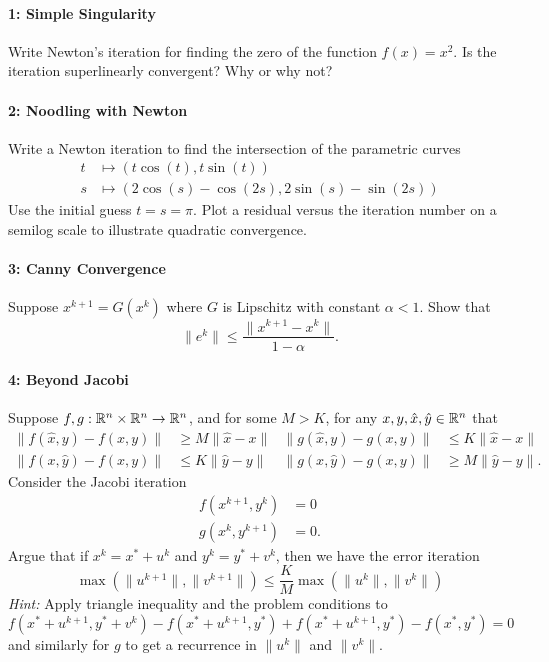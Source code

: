 \documentclass[12pt, leqno]{article}
\begin{document}

\paragraph*{1: Simple Singularity}
Write Newton's iteration for finding the zero of the function $f(x) = x^2$.
Is the iteration superlinearly convergent?  Why or why not?

\paragraph*{2: Noodling with Newton}
Write a Newton iteration to find the intersection of the
parametric curves
\begin{align*}
  t &\mapsto (t \cos(t), t \sin(t)) \\
  s &\mapsto (2 \cos(s) - \cos(2s), 2\sin(s) - \sin(2s))
\end{align*}
Use the initial guess $t = s = \pi$.  Plot a residual versus
the iteration number on a semilog scale to
illustrate quadratic convergence.

\paragraph*{3: Canny Convergence}
Suppose $x^{k+1} = G(x^k)$ where $G$ is Lipschitz with constant
$\alpha < 1$.  Show that
\[
  \|e^k\| \leq \frac{\|x^{k+1}-x^k\|}{1-\alpha}.
\]

\paragraph*{4: Beyond Jacobi}
Suppose $f,g : \mathbb{R}^n \times \mathbb{R}^n \rightarrow \mathbb{R}^n$,
and for some $M > K$, for any $x, y, \hat{x}, \hat{y} \in \mathbb{R}^n$ that
\begin{align*}
  \|f(\hat{x},y)-f(x,y)\| &\geq M \|\hat{x}-x\| &
  \|g(\hat{x},y)-g(x,y)\| &\leq K \|\hat{x}-x\| \\
  \|f(x,\hat{y})-f(x,y)\| &\leq K \|\hat{y}-y\| &
  \|g(x,\hat{y})-g(x,y)\| &\geq M \|\hat{y}-y\|.
\end{align*}
Consider the Jacobi iteration
\begin{align*}
  f(x^{k+1},y^{k}) &= 0 \\
  g(x^k,y^{k+1}) &= 0.
\end{align*}
Argue that if $x^k = x^* + u^k$ and $y^k = y^* + v^k$, then
we have the error iteration
\[
  \max(\|u^{k+1}\|, \|v^{k+1}\|) \leq \frac{K}{M} \max(\|u^k\|, \|v^k\|)
\]
{\em Hint:} Apply triangle inequality and the problem conditions to
\[
f(x^*+u^{k+1},y^*+v^{k}) - f(x^{*}+u^{k+1},y^*) +
f(x^{*}+u^{k+1},y^*)-f(x^*,y^*) = 0
\]
and similarly for $g$ to get a recurrence in $\|u^{k}\|$ and
$\|v^{k}\|$.
\end{document}
